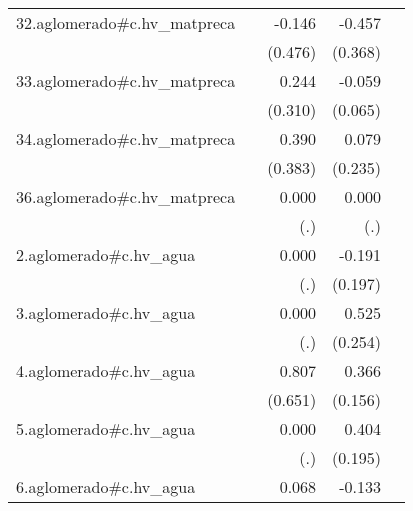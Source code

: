 {\begin{longtable}{l*{4}{D{.}{.}{-1}}}
\addlinespace
32.aglomerado#c.hv\_matpreca&                     &      -0.146         &      -0.457         &                     \\
            &                     &     (0.476)         &     (0.368)         &                     \\
\addlinespace
33.aglomerado#c.hv\_matpreca&                     &       0.244         &      -0.059         &                     \\
            &                     &     (0.310)         &     (0.065)         &                     \\
\addlinespace
34.aglomerado#c.hv\_matpreca&                     &       0.390         &       0.079         &                     \\
            &                     &     (0.383)         &     (0.235)         &                     \\
\addlinespace
36.aglomerado#c.hv\_matpreca&                     &       0.000         &       0.000         &                     \\
            &                     &         (.)         &         (.)         &                     \\
\addlinespace
2.aglomerado#c.hv\_agua&                     &       0.000         &      -0.191         &                     \\
            &                     &         (.)         &     (0.197)         &                     \\
\addlinespace
3.aglomerado#c.hv\_agua&                     &       0.000         &       0.525\sym{*}  &                     \\
            &                     &         (.)         &     (0.254)         &                     \\
\addlinespace
4.aglomerado#c.hv\_agua&                     &       0.807         &       0.366\sym{*}  &                     \\
            &                     &     (0.651)         &     (0.156)         &                     \\
\addlinespace
5.aglomerado#c.hv\_agua&                     &       0.000         &       0.404\sym{*}  &                     \\
            &                     &         (.)         &     (0.195)         &                     \\
\addlinespace
6.aglomerado#c.hv\_agua&                     &       0.068         &      -0.133         &                     \\

\end{longtable}}
